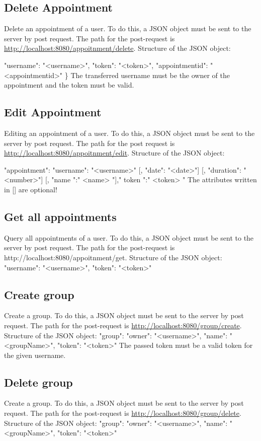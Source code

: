 \documentclass[12pt]{scrartcl}
\begin{document}
{{{{    \subsection{Delete Appointment}
        Delete an appointment of a user.
        To do this, a JSON object must be sent to the server by post request. The path for the post-request is
        \url{http://localhost:8080/appoitnment/delete}.
        Structure of the JSON object: \ {"username": "<username>", "token": "<token>", "appointmentid": "<appointmentid>" \}
        The transferred username must be the owner of the appointment and the token must be valid.

    \subsection{Edit Appointment}
        Editing an appointment of a user.
        To do this, a JSON object must be sent to the server by post request. The path for the post request is \url{http://localhost:8080/appoitnment/edit}.
        Structure of the JSON object: \ {"appointment": {"username": "<username>" [, "date": "<date>"] [, "duration": "<number>"] [, "name ":" <name> "]," token ":" <token> "}
        The attributes written in {[]} are optional!
    

    \subsection{Get all appointments}
        Query all appointments of a user.
        To do this, a JSON object must be sent to the server by post request. The path for the post-request is
        http://localhost:8080/appoitnment/get.
        Structure of the JSON object: {"username": "<username>", "token": "<token>"}

    \subsection{Create group}
        Create a group.
        To do this, a JSON object must be sent to the server by post request. The path for the post-request is
        \url {http://localhost:8080/group/create}.
        Structure of the JSON object: {"group": {"owner": "<username>", "name": "<groupName>"}, "token": "<token>"}
        The passed token must be a valid token for the given username.

    \subsection{Delete group}
        Create a group.
        To do this, a JSON object must be sent to the server by post request. The path for the post-request is
        \url {http://localhost:8080/group/delete}.
        Structure of the JSON object: {"group": {"owner": "<username>", "name": "<groupName>"}, "token": "<token>"}

}}}}}}
\end{document}
